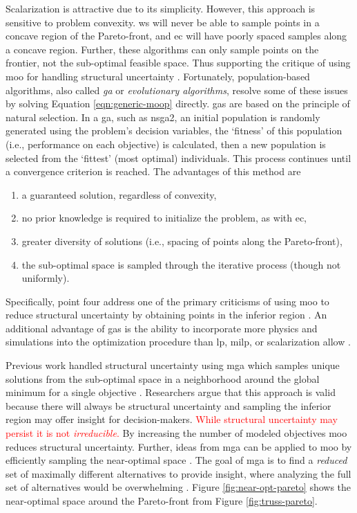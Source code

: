 Scalarization is attractive due to its simplicity. However, this approach is sensitive
to problem convexity. \ac{ws} will never be able to sample points in a concave region 
of the Pareto-front, and \ac{ec} will have poorly spaced samples along a concave 
region. Further, these algorithms can only sample points on the frontier, not the 
sub-optimal feasible space. Thus supporting the critique of using \ac{moo} for 
handling structural uncertainty \cite{decarolis_using_2011}. Fortunately, 
population-based algorithms, also called \textit{\ac{ga}} or \textit{evolutionary algorithms}, resolve some of these issues by solving Equation
\ref{eqn:generic-moop} directly. \Acp{ga} are based on the principle of natural 
selection. In a \ac{ga}, such as \ac{nsga2}, an initial population is randomly 
generated using the problem's decision variables, the `fitness' of this population 
(i.e., performance on each objective) is calculated, then a new population is selected 
from the `fittest' (most optimal) individuals. This process continues until a 
convergence criterion is reached. The advantages of this method are
\begin{enumerate}
    \item a guaranteed solution, regardless of convexity,
    \item no prior knowledge is required to initialize the problem, as with \ac{ec},
    \item greater diversity of solutions (i.e., spacing of points along the Pareto-front),
    \item the sub-optimal space is sampled through the iterative process (though not uniformly).
\end{enumerate}
Specifically, point four address one of the primary criticisms of using \ac{moo} to 
reduce structural uncertainty by obtaining points in the inferior region \cite{loughlin_genetic_2001,zechman_evolutionary_2004, zechman_evolutionary_2013}. An additional advantage of \acp{ga} is the ability to incorporate more physics and simulations into the optimization procedure than \ac{lp}, \ac{milp}, or scalarization allow \cite{loughlin_genetic_2001}. 

Previous work handled structural uncertainty using \ac{mga} which samples unique 
solutions from the sub-optimal space in a neighborhood around the global minimum for a single objective \cite{decarolis_using_2011}. Researchers argue that this approach is valid because there will always be structural uncertainty and sampling the inferior region may offer insight for decision-makers. \textcolor{red}{While structural uncertainty may persist it is not \textit{irreducible}.} By increasing the number of modeled objectives \ac{moo}
reduces structural uncertainty. Further, ideas from \ac{mga} can be applied to \ac{moo} by efficiently sampling the near-optimal space \cite{loughlin_genetic_2001, zechman_evolutionary_2004,zechman_evolutionary_2013,pajares_comparison_2021}. The goal of \ac{mga} is to find a \textit{reduced} set of maximally different alternatives to provide insight, where analyzing the full set of alternatives would
be overwhelming \cite{decarolis_using_2011, pajares_comparison_2021}. Figure \ref{fig:near-opt-pareto} shows the near-optimal space around the Pareto-front from
Figure \ref{fig:truss-pareto}.

